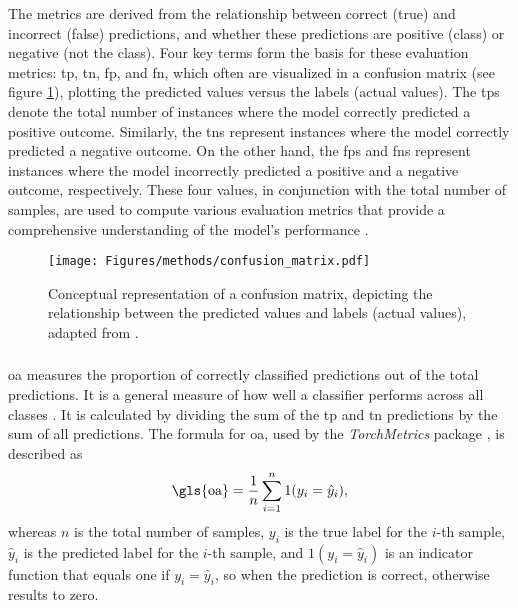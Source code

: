 The metrics are derived from the relationship between correct (true) and incorrect (false) predictions, and whether these predictions are positive (class) or negative (not the class). Four key terms form the basis for these evaluation metrics: \gls{tp}, \gls{tn}, \gls{fp}, and \gls{fn}, which often are visualized in a confusion matrix (see figure \ref{fig:conf_matrix}), plotting the predicted values versus the labels (actual values). The \glspl{tp} denote the total number of instances where the model correctly predicted a positive outcome. Similarly, the \glspl{tn} represent instances where the model correctly predicted a negative outcome. On the other hand, the \glspl{fp} and \glspl{fn} represent instances where the model incorrectly predicted a positive and a negative outcome, respectively. These four values, in conjunction with the total number of samples, are used to compute various evaluation metrics that provide a comprehensive understanding of the model's performance \autocite{Basheer.Wang.ea2022,Fawcett2006,Hu.Li.ea2020}.

\begin{figure}[htb]
    \centering
    \texttt{[image: Figures/methods/confusion\_matrix.pdf]}
    \caption[Concept of Confusion Matrices]{Conceptual representation of a confusion matrix, depicting the relationship between the predicted values and labels (actual values), adapted from \autocite{Fawcett2006}.}
    \label{fig:conf_matrix}
\end{figure}

\subsubsection*{}

\gls{oa} measures the proportion of correctly classified predictions out of the total predictions. It is a general measure of how well a classifier performs across all classes \autocite{Moharram.Sundaram2023,Zhao.Tu.ea2023}. It is calculated by dividing the sum of the \gls{tp} and \gls{tn} predictions by the sum of all predictions. The formula for \gls{oa}, used by the \emph{TorchMetrics} package \autocite{Torchmetrics2024a}, is described as
\begin{equation}
    \text{\gls{oa}} = \frac{1}{n}\sum_{i=1}^n 1(y_i = \hat{y}_i),
\end{equation}
whereas \( n \) is the total number of samples, \( y_i \) is the true label for the \( i \)-th sample, \( \hat{y}_i \) is the predicted label for the \( i \)-th sample, and \( 1(y_i = \hat{y}_i) \) is an indicator function that equals one if \( y_i = \hat{y}_i \), so when the prediction is correct, otherwise results to zero.

